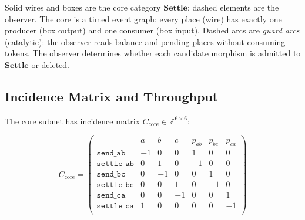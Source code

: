 \documentclass[11pt,a4paper]{article}
\newcommand{\Z}{\mathbb{Z}}
\newcommand{\Settle}{\mathbf{Settle}}
\begin{document}
\begin{center}
\end{center}

Solid wires and boxes are the core category $\Settle$; dashed elements are the observer.
The core is a timed event graph: every place (wire) has exactly one producer (box output) and one consumer (box input).
Dashed arcs are \emph{guard arcs} (catalytic): the observer reads balance and pending places without consuming tokens.
The observer determines whether each candidate morphism is admitted to $\Settle$ or deleted.

\subsection{Incidence Matrix and Throughput}

The core subnet has incidence matrix $C_{\mathrm{core}} \in \Z^{6 \times 6}$:

\[
C_{\mathrm{core}} = \begin{pmatrix}
  & a & b & c & p_{ab} & p_{bc} & p_{ca} \\
\mathtt{send\_ab}   & -1 &  0 &  0 &  1 &  0 &  0 \\
\mathtt{settle\_ab} &  0 &  1 &  0 & -1 &  0 &  0 \\
\mathtt{send\_bc}   &  0 & -1 &  0 &  0 &  1 &  0 \\
\mathtt{settle\_bc} &  0 &  0 &  1 &  0 & -1 &  0 \\
\mathtt{send\_ca}   &  0 &  0 & -1 &  0 &  0 &  1 \\
\mathtt{settle\_ca} &  1 &  0 &  0 &  0 &  0 & -1 \\
\end{pmatrix}
\]
\end{document}
